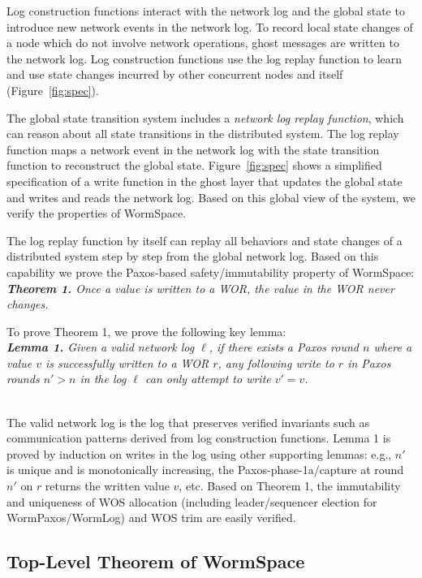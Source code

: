 Log construction functions interact with the network log and the global state to introduce new network events in the network log. To record local state changes of a node which do not involve network operations, ghost messages are written to the network log. Log construction functions use the log replay function to learn and use state changes incurred by other concurrent nodes and itself (Figure~\ref{fig:spec}).


The global state transition system includes a \textit{network log replay function}, which can reason about all state transitions in the distributed system. The log replay function maps a network event in the network log with the state transition function to reconstruct the global state. Figure~\ref{fig:spec} shows a simplified specification of a write function in the ghost layer that updates the global state and writes and reads the network log. Based on this global view of the system, we verify the properties of WormSpace.

The log replay function by itself can replay all behaviors and state changes of a distributed system step by step from the global network log. Based on this capability we prove the Paxos-based safety/immutability property of WormSpace:
\\
\textit{\textbf{Theorem 1.} Once a value is written to a WOR, the value in the WOR never changes.}


\noindent To prove Theorem 1, we prove the following key lemma: 
\\
\textit{\textbf{Lemma 1.} Given a valid network log $\ell$, if there exists a Paxos round $n$ where a value $v$ is successfully written to a WOR $r$, any following write to $r$ in Paxos rounds $n' > n$ in the log $\ell$
can only attempt to write $v' = v$.}

\noindent\\
	The valid network log is the log that preserves verified invariants such as communication patterns derived from log construction functions.
Lemma 1 is proved by induction on writes in the log using other supporting lemmas: e.g., $n'$ is unique and is monotonically increasing, the Paxos-phase-1a/capture at round $n'$ on $r$ returns the written value $v$, etc.
Based on Theorem 1, the immutability and uniqueness of WOS allocation (including leader/sequencer election for WormPaxos/WormLog) and WOS trim are easily verified. 




\subsection{Top-Level Theorem of WormSpace}

